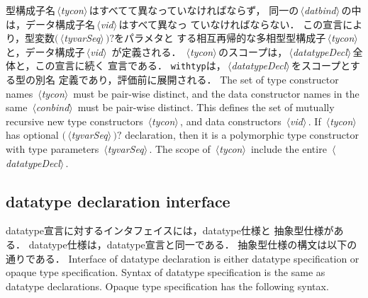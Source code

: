 \documentclass{jbook}
\newcommand{\txt}[2]{#2}
\newcommand{\nonterm}[1]{\mbox{$\,\langle$}{\it #1}\mbox{$\rangle\,$}}
\newcommand{\term}[1]{\mbox{{\tt #1}}}
\newcommand{\optional}[1]{\mbox{$($}{\protect #1}\mbox{$)?$}}
\begin{document}
\ifjp%
	型構成子名\nonterm{tycon}はすべてて異なっていなければならず，
同一の\nonterm{datbind}の中は，データ構成子名\nonterm{vid}はすべて異なっ
ていなければならない．
	この宣言により，型変数\optional{\nonterm{tyvarSeq}}をパラメタと
する相互再帰的な多相型型構成子\nonterm{tycon}と，データ構成子\nonterm{vid}
が定義される．
	\nonterm{tycon}のスコープは，\nonterm{datatypeDecl}全体と，この宣言に続く
宣言である．
	\term{withtyp}は，\nonterm{datatypeDecl}をスコープとする型の別名
定義であり，評価前に展開される．
\else%
	The set of type constructor names \nonterm{tycon} must be
pair-wise distinct, and the data constructor names in the same
\nonterm{conbind} must be pair-wise distinct.
	This defines the set of mutually recursive new type constructors 
\nonterm{tycon}, and data constructors \nonterm{vid}.
	If \nonterm{tycon} has optional \optional{\nonterm{tyvarSeq}}
declaration, then it is a polymorphic type constructor with type
parameters \nonterm{tyvarSeq}.
	The scope of \nonterm{tycon} include the entire
\nonterm{datatypeDecl}.
\fi%
	

\subsection{\txt{datatype宣言インタフェース}{datatype declaration interface}}
\ifjp%
	datatype宣言に対するインタフェイスには，datatype仕様と
抽象型仕様がある．
	datatype仕様は，datatype宣言と同一である．
	抽象型仕様の構文は以下の通りである．
\else%
	Interface of datatype declaration is either
datatype specification or opaque type specification.
	Syntax of datatype specification is the same as
datatype declarations.
	Opaque type specification has the following syntax.
\fi%
\end{document}
